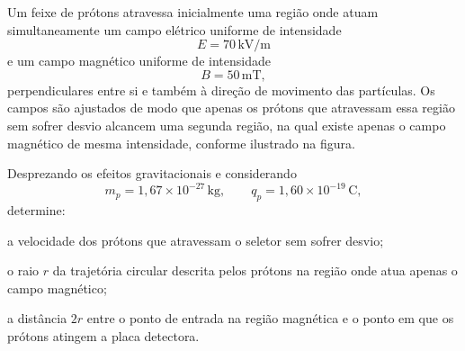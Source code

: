 \begin{questao}[4]{}
 Um feixe de prótons atravessa inicialmente uma região onde atuam simultaneamente um campo elétrico uniforme de intensidade
\[
E = 70\,\mathrm{kV/m}
\]
e um campo magnético uniforme de intensidade
\[
B = 50\,\mathrm{mT},
\]
perpendiculares entre si e também à direção de movimento das partículas. Os campos são ajustados de modo que apenas os prótons que atravessam essa região sem sofrer desvio alcancem uma segunda região, na qual existe apenas o campo magnético de mesma intensidade, conforme ilustrado na figura.

Desprezando os efeitos gravitacionais e considerando
\[
m_p = 1{,}67\times10^{-27}\,\mathrm{kg},
\qquad
q_p = 1{,}60\times10^{-19}\,\mathrm{C},
\]
determine:

\begin{itensq}
    \item a velocidade dos prótons que atravessam o seletor sem sofrer desvio;
    \item o raio \(r\) da trajetória circular descrita pelos prótons na região onde atua apenas o campo magnético;
    \item a distância \(2r\) entre o ponto de entrada na região magnética e o ponto em que os prótons atingem a placa detectora.
\end{itensq}



\end{questao}
